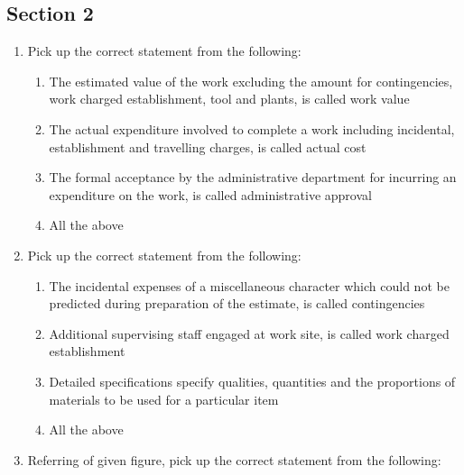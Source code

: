 \documentclass[11pt,a4paper]{article}
\begin{document}
\subsection*{Section 2}
\begin{enumerate}
\item{Pick up the correct statement from the following:}
\begin{enumerate}[label=\Alph*.]
\item{The estimated value of the work excluding the amount for contingencies, work charged establishment, tool and plants, is called work value}
\item{The actual expenditure involved to complete a work including incidental, establishment and travelling charges, is called actual cost}
\item{The formal acceptance by the administrative department for incurring an expenditure on the work, is called administrative approval}
\item{All the above}
\end{enumerate}
\item{Pick up the correct statement from the following:}
\begin{enumerate}[label=\Alph*.]
\item{The incidental expenses of a miscellaneous character which could not be predicted during preparation of the estimate, is called contingencies}
\item{Additional supervising staff engaged at work site, is called work charged establishment}
\item{Detailed specifications specify qualities, quantities and the proportions of materials to be used for a particular item}
\item{All the above}
\end{enumerate}
\item{Referring of given figure, pick up the correct statement from the following: \\

}
\end{enumerate}
\end{document}
